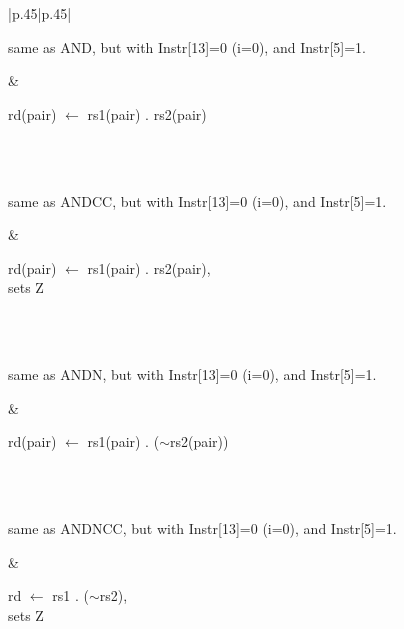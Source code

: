 \documentclass{book}
\begin{document}
\begin{table}[p]
\begin{tabular}[p]{|p{.45\textwidth}|p{.45\textwidth}|}
 \hline 
 \parbox{\linewidth}{		  same as AND, but with Instr[13]=0 (i=0), and Instr[5]=1.} & 
 \parbox{\linewidth}{		rd(pair) $\leftarrow$ rs1(pair) . rs2(pair)}\\
\hline
\hline
{} \\ 
 \hline 
 \parbox{\linewidth}{		  same as ANDCC, but with Instr[13]=0 (i=0), and Instr[5]=1.} & 
 \parbox{\linewidth}{		rd(pair) $\leftarrow$ rs1(pair) . rs2(pair),\\ sets Z}\\
\hline
\hline
{} \\ 
 \hline 
 \parbox{\linewidth}{		  same as ANDN, but with Instr[13]=0 (i=0), and Instr[5]=1.} & 
 \parbox{\linewidth}{		rd(pair) $\leftarrow$ rs1(pair) . ($\sim$rs2(pair))}\\
\hline
\hline
{} \\ 
 \hline 
 \parbox{\linewidth}{		  same as ANDNCC, but with Instr[13]=0 (i=0), and Instr[5]=1.} & 
 \parbox{\linewidth}{		rd $\leftarrow$ rs1 . ($\sim$rs2),\\ sets Z}\\
\hline
  \end{tabular}
  \caption{64 bit Logical Instructions}
  \label{tab:64bit:logical:insns}
\end{table}





\end{document}
